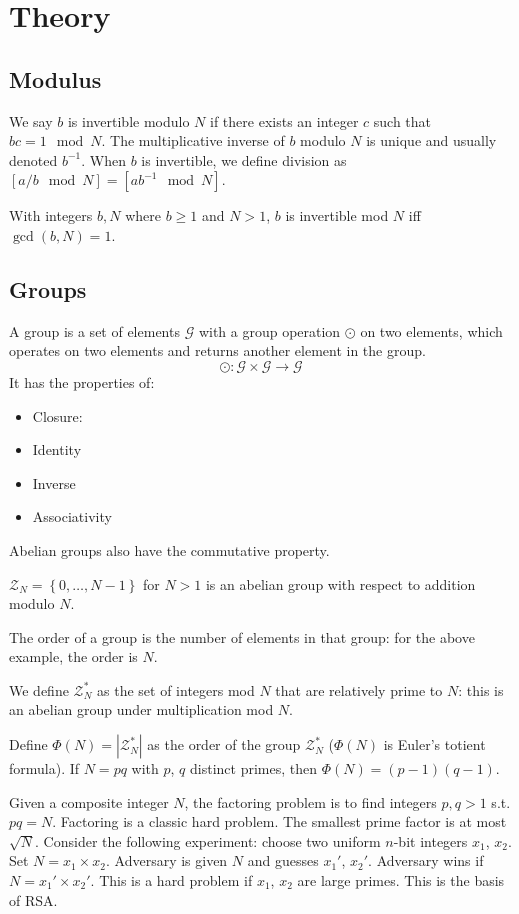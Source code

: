 \section{Theory}

\subsection{Modulus}
We say $b$ is invertible modulo 
$N$ if there exists an integer $c$ such that 
$bc = 1 \mod N$. The multiplicative 
inverse of $b$ modulo $N$ is unique and 
usually denoted $b^{-1}$. When $b$ is 
invertible, we define division as 
$[a/b \mod N] = [ab^{-1} \mod N]$. 

With integers $b, N$ where $b \geq 1$ 
and $N > 1$, $b$ is invertible mod $N$ 
iff $\gcd(b, N) = 1$. 

\subsection{Groups}
A group is a set of elements $\mathcal{G}$
with a group operation $\odot$ on two 
elements, which operates on two elements 
and returns another element in the group. 
\begin{equation}
    \odot: \mathcal{G} \times \mathcal{G} \rightarrow \mathcal{G}
\end{equation}
It has the properties of:
\begin{itemize}
    \item Closure:
    \item Identity
    \item Inverse 
    \item Associativity
\end{itemize}
Abelian groups also have the commutative 
property. 

$\mathcal{Z}_N = \left\{0, \dots, N - 1\right\}$
for $N > 1$ is an abelian group with respect 
to addition modulo $N$. 

The order of a group is the number of 
elements in that group: for the above example,
the order is $N$. 

We define $\mathcal{Z}_N^*$ as the set of 
integers mod $N$ that are relatively prime 
to $N$: this is an abelian group under 
multiplication mod $N$. 

Define $\Phi(N) = |\mathcal{Z}_N^*|$ as 
the order of the group $\mathcal{Z}_N^*$
($\Phi(N)$ is Euler's totient formula).
If $N = pq$ with $p$, $q$ distinct primes, 
then $\Phi(N) = (p-1)(q-1)$.

Given a composite integer $N$, the factoring 
problem is to find integers $p, q > 1$ s.t.
$pq=N$. Factoring is a classic hard problem. 
The smallest prime factor is at most $\sqrt{N}$. 
Consider the following experiment: choose 
two uniform $n$-bit integers $x_1$, $x_2$. 
Set $N = x_1 \times x_2$. Adversary is given 
$N$ and guesses $x_1'$, $x_2'$. Adversary wins 
if $N = x_1' \times x_2'$. This is a 
hard problem if $x_1$, $x_2$ are large primes. 
This is the basis of RSA. 

